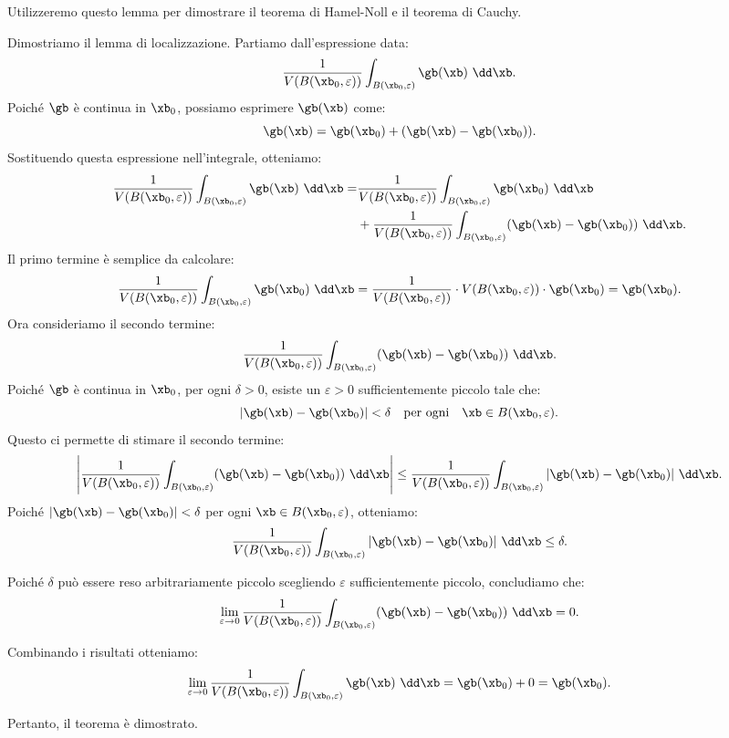 Utilizzeremo questo lemma per dimostrare il teorema di Hamel-Noll e il teorema di Cauchy.

\begin{remark}
Dimostriamo il lemma di localizzazione. 
Partiamo dall'espressione data:
\[
\frac{1}{V(B(\xb_0, \varepsilon))} \int_{B(\xb_0, \varepsilon)} \gb(\xb) \, \,\dd \xb.
\]
Poiché \( \gb \) è continua in \( \xb_0 \), possiamo esprimere \( \gb(\xb) \) come:
\[
\gb(\xb) = \gb(\xb_0) + (\gb(\xb) - \gb(\xb_0)).
\]
Sostituendo questa espressione nell'integrale, otteniamo:
\[
\begin{aligned}
\frac{1}{V(B(\xb_0, \varepsilon))} \int_{B(\xb_0, \varepsilon)} \gb(\xb) \, \,\dd \xb = &\frac{1}{V(B(\xb_0, \varepsilon))} \int_{B(\xb_0, \varepsilon)} \gb(\xb_0) \, \,\dd \xb \\
&+ \frac{1}{V(B(\xb_0, \varepsilon))} \int_{B(\xb_0, \varepsilon)} (\gb(\xb) - \gb(\xb_0)) \, \,\dd \xb.
\end{aligned}
\]
Il primo termine è semplice da calcolare:
\[
\frac{1}{V(B(\xb_0, \varepsilon))} \int_{B(\xb_0, \varepsilon)} \gb(\xb_0) \, \,\dd \xb = \frac{1}{V(B(\xb_0, \varepsilon))} \cdot V(B(\xb_0, \varepsilon)) \cdot \gb(\xb_0) = \gb(\xb_0).
\]
Ora consideriamo il secondo termine:
\[
\frac{1}{V(B(\xb_0, \varepsilon))} \int_{B(\xb_0, \varepsilon)} (\gb(\xb) - \gb(\xb_0)) \, \,\dd \xb.
\]
Poiché \( \gb \) è continua in \( \xb_0 \), per ogni \( \delta > 0 \), esiste un \( \varepsilon > 0 \) sufficientemente piccolo tale che:
\[
|\gb(\xb) - \gb(\xb_0)| < \delta \quad \text{per ogni} \quad \xb \in B(\xb_0, \varepsilon).
\]
Questo ci permette di stimare il secondo termine:
\[
\left| \frac{1}{V(B(\xb_0, \varepsilon))} \int_{B(\xb_0, \varepsilon)} (\gb(\xb) - \gb(\xb_0)) \, \,\dd \xb \right| \leq \frac{1}{V(B(\xb_0, \varepsilon))} \int_{B(\xb_0, \varepsilon)} |\gb(\xb) - \gb(\xb_0)| \, \,\dd \xb.
\]
Poiché \( |\gb(\xb) - \gb(\xb_0)| < \delta \) per ogni \( \xb \in B(\xb_0, \varepsilon) \), otteniamo:
\[
\frac{1}{V(B(\xb_0, \varepsilon))} \int_{B(\xb_0, \varepsilon)} |\gb(\xb) - \gb(\xb_0)| \, \,\dd \xb \leq \delta.
\]

Poiché \( \delta \) può essere reso arbitrariamente piccolo scegliendo \( \varepsilon \) sufficientemente piccolo, concludiamo che:
\[
\lim_{\varepsilon \to 0} \frac{1}{V(B(\xb_0, \varepsilon))} \int_{B(\xb_0, \varepsilon)} (\gb(\xb) - \gb(\xb_0)) \, \,\dd \xb = 0.
\]

Combinando i risultati otteniamo:
\[
\lim_{\varepsilon \to 0} \frac{1}{V(B(\xb_0, \varepsilon))} \int_{B(\xb_0, \varepsilon)} \gb(\xb) \, \,\dd \xb = \gb(\xb_0) + 0 = \gb(\xb_0).
\]

Pertanto, il teorema è dimostrato.


\end{remark}

